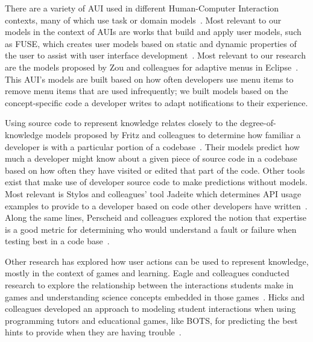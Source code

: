 There are a variety of AUI used in different Human-Computer Interaction contexts, many of which use task or domain models~\cite{schlungbaum1996model}. Most relevant to our models in the context of AUIs are works that build and apply user models, such as FUSE, which creates user models based on static and dynamic properties of the user to assist with user interface development~\cite{lonczewski1996fuse}. Most relevant to our research are the models proposed by Zou and colleagues for adaptive menus in Eclipse~\cite{zou2008adapting}.
This AUI's models are built based on how often developers use menu items to remove menu items that are used infrequently; we built models based on the concept-specific code a developer writes to adapt notifications to their experience.


Using source code to represent knowledge relates closely to the degree-of-knowledge models proposed by Fritz and colleagues to determine how familiar a developer is with a particular portion of a codebase~\cite{fritz2010degree}. Their models predict how much a developer might know about a given piece of source code in a codebase based on how often they have visited or edited that part of the code.
Other tools exist that make use of developer source code to make predictions without models. Most relevant is Stylos and colleagues' tool Jadeite which determines API usage examples to provide to a developer based on code other developers have written~\cite{stylos2009improving}.
Along the same lines, Perscheid and colleagues explored the notion that expertise is a good metric for determining who would understand a fault or failure when testing best in a code base~\cite{perscheid2012test}.

Other research has explored how user actions can be used to represent knowledge, mostly in the context of games and learning. Eagle and colleagues conducted research to explore the relationship between the interactions students make in games and understanding science concepts embedded in those games~\cite{eagle2015measuring}. Hicks and colleagues developed an approach to modeling student interactions when using programming tutors and educational games, like BOTS, for predicting the best hints to provide when they are having trouble~\cite{hicks2014building}.



